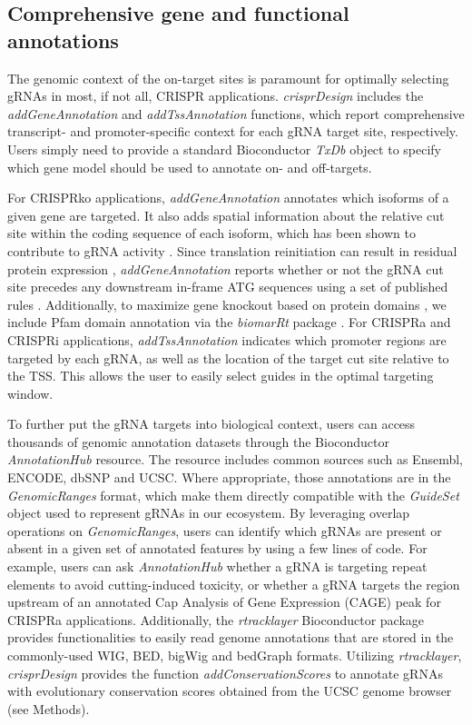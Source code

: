 \documentclass[pdftex,english,10pt]{article}
\begin{document}
\subsection*{Comprehensive gene and functional annotations}

The genomic context of the on-target sites is paramount for optimally selecting gRNAs in most, if not all, CRISPR applications. 
\textit{crisprDesign} includes the \textit{addGeneAnnotation} and \textit{addTssAnnotation} functions, which 
report comprehensive transcript- and promoter-specific context for each gRNA target site, respectively. 
Users simply need to provide a standard Bioconductor \textit{TxDb} object to specify which gene model should be used to annotate on- and off-targets.

For CRISPRko applications, \textit{addGeneAnnotation} annotates which isoforms of a given gene are targeted. It also adds spatial information about the relative cut site within the coding sequence of each isoform, which has been shown to contribute to gRNA activity \citep{azimuth}. Since translation reinitiation can result in residual protein expression \citep{smits2019biological}, \textit{addGeneAnnotation} reports whether or not the gRNA cut site precedes any downstream in-frame ATG sequences using a set of published rules \citep{cohen2019nonsense}. Additionally, to maximize gene knockout based on protein domains \citep{he2019novo}, we include Pfam domain annotation \citep{pfam} via the \textit{biomarRt} package \citep{biomart}. For CRISPRa and CRISPRi applications, \textit{addTssAnnotation} indicates which promoter regions are targeted by each gRNA, as well as the location of the target cut site relative to the TSS. This allows the user to easily select guides in the optimal targeting window. 
 
To further put the gRNA targets into biological context, users can access thousands of genomic annotation datasets through the Bioconductor \textit{AnnotationHub} resource.  The resource includes common sources such as Ensembl, ENCODE, dbSNP and UCSC. Where appropriate, those annotations are in the \textit{GenomicRanges} format, which make them directly compatible with the \textit{GuideSet} object used to represent gRNAs in our ecosystem. By leveraging overlap operations on \textit{GenomicRanges}, users can identify which gRNAs are present or absent in a given set of annotated features by using a few lines of code.  For example, users can ask \textit{AnnotationHub} whether a gRNA is targeting repeat elements to avoid cutting-induced toxicity, or whether a gRNA targets the region upstream of an annotated Cap Analysis of Gene Expression (CAGE) peak for CRISPRa applications. Additionally, the \textit{rtracklayer} Bioconductor package \citep{rtracklayer} provides functionalities to easily read genome annotations that are stored in the commonly-used WIG, BED, bigWig and bedGraph formats. Utilizing \textit{rtracklayer}, \textit{crisprDesign} provides the function \textit{addConservationScores} to annotate gRNAs with evolutionary conservation scores obtained from the UCSC genome browser (see Methods). 
\end{document}
